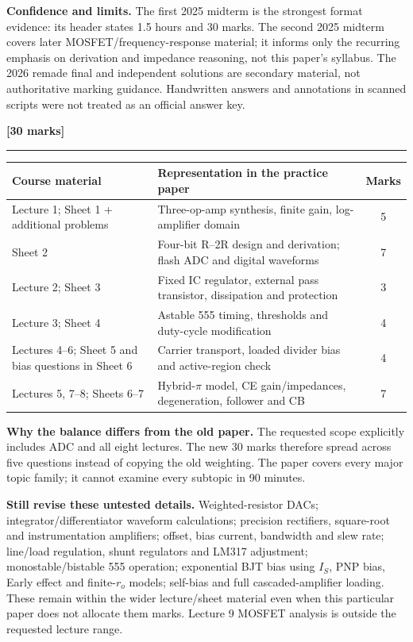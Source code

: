 \documentclass[11pt,a4paper]{article}
\newcommand{\q}[2]{\par\vspace{3pt}{\large\bfseries\color{ink}#1}\hfill\textbf{[#2 marks]}\par\hrule\vspace{7pt}}
\begin{document}
\textbf{Confidence and limits.} The first 2025 midterm is the strongest format evidence: its header states 1.5 hours and 30 marks. The second 2025 midterm covers later MOSFET/frequency-response material; it informs only the recurring emphasis on derivation and impedance reasoning, not this paper's syllabus. The 2026 remade final and independent solutions are secondary material, not authoritative marking guidance. Handwritten answers and annotations in scanned scripts were not treated as an official answer key.
\newpage
\q{Coverage and balance}{30}
\begin{center}\small\begin{tabular}{p{3.2cm}p{7.7cm}c}\toprule
Course material & Representation in the practice paper & Marks\\\midrule
Lecture 1; Sheet 1 + additional problems & Three-op-amp synthesis, finite gain, log-amplifier domain &5\\
Sheet 2 & Four-bit R--2R design and derivation; flash ADC and digital waveforms &7\\
Lecture 2; Sheet 3 & Fixed IC regulator, external pass transistor, dissipation and protection &3\\
Lecture 3; Sheet 4 & Astable 555 timing, thresholds and duty-cycle modification &4\\
Lectures 4--6; Sheet 5 and bias questions in Sheet 6 & Carrier transport, loaded divider bias and active-region check &4\\
Lectures 5, 7--8; Sheets 6--7 & Hybrid-$\pi$ model, CE gain/impedances, degeneration, follower and CB &7\\\bottomrule
\end{tabular}\end{center}
\textbf{Why the balance differs from the old paper.} The requested scope explicitly includes ADC and all eight lectures. The new 30 marks therefore spread across five questions instead of copying the old weighting. The paper covers every major topic family; it cannot examine every subtopic in 90 minutes.

\textbf{Still revise these untested details.} Weighted-resistor DACs; integrator/differentiator waveform calculations; precision rectifiers, square-root and instrumentation amplifiers; offset, bias current, bandwidth and slew rate; line/load regulation, shunt regulators and LM317 adjustment; monostable/bistable 555 operation; exponential BJT bias using $I_S$, PNP bias, Early effect and finite-$r_o$ models; self-bias and full cascaded-amplifier loading. These remain within the wider lecture/sheet material even when this particular paper does not allocate them marks. Lecture 9 MOSFET analysis is outside the requested lecture range.
\end{document}
